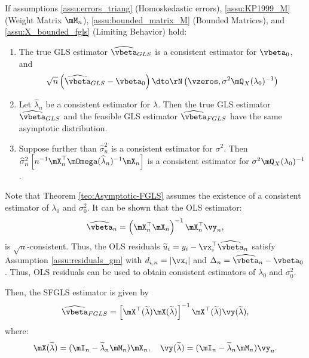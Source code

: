 \documentclass[english,12pt]{book}\usepackage[]{graphicx}\usepackage[]{xcolor}
\begin{document}
\begin{theorem}\label{teo:Asymptotic-FGLS}
  If assumptions \ref{assu:errors_triang} (Homoskedastic errors), \ref{assu:KP1999_M} (Weight Matrix $\mM_n$), \ref{assu:bounded_matrix_M} (Bounded Matrices), and \ref{assu:X_bounded_fgls} (Limiting Behavior) hold: 
  \begin{enumerate}
    \item The true GLS estimator $\widehat{\vbeta}_{GLS}$ is a consistent estimator for $\vbeta_0$, and
    \begin{equation*}
      \sqrt{n}\left(\widehat{\vbeta}_{GLS} - \vbeta_0\right)\dto \rN\left(\vzeros, \sigma^2 \mQ_X(\lambda_0)^{-1}\right)
    \end{equation*}
    
    \item Let $\widehat{\lambda}_n$ be a consistent estimator for $\lambda$. Then the true GLS estimator $\widehat{\vbeta}_{GLS}$ and the feasible GLS estimator $\widehat{\vbeta}_{FGLS}$ have the same asymptotic distribution.
    \item Suppose further than $\widehat{\sigma}^2_n$ is a consistent estimator for $\sigma^2$. Then $\widehat{\sigma}^2_n\left[n^{-1}\mX^\top_n\mOmega(\widehat{\lambda}_n)^{-1}\mX_n\right]$ is a consistent estimator for $\sigma^2 \mQ_X(\lambda_0)^{-1}$.
  \end{enumerate}
\end{theorem}

Note that Theorem \ref{teo:Asymptotic-FGLS} assumes the existence of a consistent estimator of $\lambda_0$ and $\sigma^2_0$. It can be shown that the OLS estimator:
\begin{equation*}
\widehat{\vbeta}_n = \left(\mX^\top_n\mX_n\right)^{-1}\mX^\top_n\vy_n, 
\end{equation*}
%
is $\sqrt{n}$-consistent. Thus, the OLS residuals $\widetilde{u}_i = y_i - \vx_i^\top\widehat{\vbeta}_n$ satisfy Assumption \ref{assu:residuals_gm} with $d_{i, n} = \left|\vx_i\right|$ and $\Delta_n = \widehat{\vbeta}_n -\vbeta_0$. Thus, OLS residuals can be used to obtain consistent estimators of $\lambda_0$ and $\sigma^2_0$.

Then, the SFGLS estimator is given by
\begin{equation*}
  \widehat{\vbeta}_{FGLS} = \left[\mX^\top(\widetilde{\lambda})\mX(\widetilde{\lambda})\right]^{-1}\mX^\top(\widetilde{\lambda})\vy(\widetilde{\lambda}),
\end{equation*}
%
where:
\begin{equation*}
  \mX(\widetilde{\lambda})  = (\mI_n-\widetilde{\lambda}_n\mM_n)\mX_n, \quad \vy(\widetilde{\lambda})  = (\mI_n-\widetilde{\lambda}_n\mM_n)\vy_n.
\end{equation*}
\end{document}
